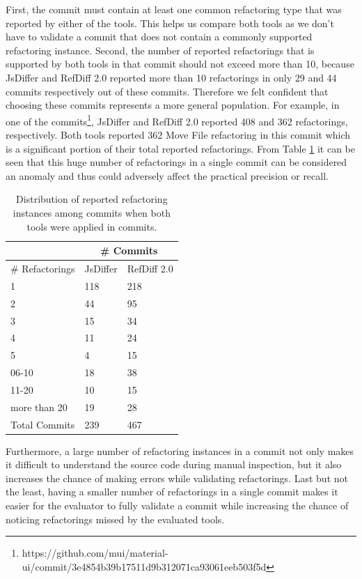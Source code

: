 \documentclass[letterpaper,12pt,onecolumn,final]{report}
\begin{document}
First, the commit must contain at least one common refactoring type that was reported by either of the tools. This helps us compare both tools as we don't have to validate a commit that does not contain a commonly supported refactoring instance. Second, the number of reported refactorings that is supported by both tools in that commit should not exceed more than 10, because JsDiffer and RefDiff 2.0 reported more than 10 refactorings in only 29 and 44 commits respectively out of these \evCompareRandomCommitCount{} commits. Therefore we felt confident that choosing these commits represents a more general population. For example, in one of the commits\footnote{https://github.com/mui/material-ui/commit/3e4854b39b17511d9b312071ca93061eeb503f5d}, JsDiffer and RefDiff 2.0 reported 408 and 362 refactorings, respectively. Both tools reported 362 Move File refactoring in this commit which is a significant portion of their total reported refactorings. From Table \ref{table:refcountrange} it can be seen that this huge number of refactorings in a single commit can be considered an anomaly and thus could adversely affect the practical precision or recall.


\begin{table}[!ht]
    \centering
    \caption{Distribution of reported refactoring instances among commits when both tools were applied in \evTotalCommits{} commits.}
    \begin{tabular}{|l|l|l|}
    \hline
        & \multicolumn{2}{|c|}{\# Commits} \\ \hline
        \# Refactorings & JsDiffer & RefDiff 2.0 \\ \hline
        1 & 118 & 218 \\
        2 & 44 & 95 \\
        3 & 15 & 34 \\
        4 & 11 & 24 \\
        5 & 4 & 15 \\
        06-10 & 18 & 38 \\
        11-20 & 10 & 15 \\
        more than 20 & 19 & 28 \\ \hline
        Total Commits & 239 & 467 \\ \hline
    \end{tabular}
    \label{table:refcountrange}
\end{table}

Furthermore, a large number of refactoring instances in a commit not only makes it difficult to understand the source code during manual inspection, but it also increases the chance of making errors while validating refactorings. Last but not the least, having a smaller number of refactorings in a single commit makes it easier for the evaluator to fully validate a commit while increasing the chance of noticing refactorings missed by the evaluated tools. 
\end{document}
